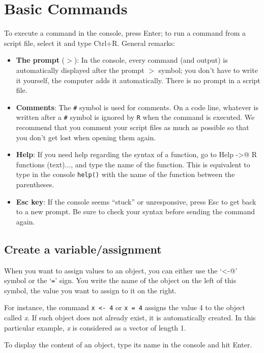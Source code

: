 \documentclass[a4paper,12pt]{article}\usepackage[]{graphicx}\usepackage[]{color}
\begin{document}
\section{Basic Commands}

To execute a command in the console, press Enter; to run a command from a script file, select it and type Ctrl+R. General remarks:
\begin{itemize}
\item{\textbf{The prompt} ($>$): In the console, every command (and output) is automatically displayed after the prompt $>$ symbol; you don't have to write it yourself, the computer adds it automatically. There is no prompt in a script file.}
\item{\textbf{Comments}: The \texttt{\#} symbol is used for comments. On a code line, whatever is written after a \texttt{\#} symbol is ignored by \texttt{R} when the command is executed. We recommend that you comment your script files as much as possible so that you don't get lost when opening them again.}
\item{\textbf{Help}: If you need help regarding the syntax of a function, go to \textsf{Help} \verb@->@ \textsf{R functions (text)...}, and type the name of the function. This is equivalent to type in the console \texttt{help()} with the name of the function between the parentheses.}
\item{\textbf{Esc key}: If the console seems ``stuck'' or unresponsive, press Esc to get back to a new prompt. Be sure to check your syntax before sending the command again.}
\end{itemize}

\subsection{Create a variable/assignment} \label{variable}

When you want to assign values to an object, you can either use the `\verb@<-@' symbol or the `\texttt{=}' sign. You write the name of the object on the left of this symbol, the value you want to assign to it on the right.

For instance, the command \texttt{x <- 4} or \texttt{x = 4} assigns the value 4 to the object called \emph{x}. If such object does not already exist, it is automatically created. In this particular example, \emph{x} is considered as a vector of length 1.

To display the content of an object, type its name in the console and hit Enter.
\end{document}
